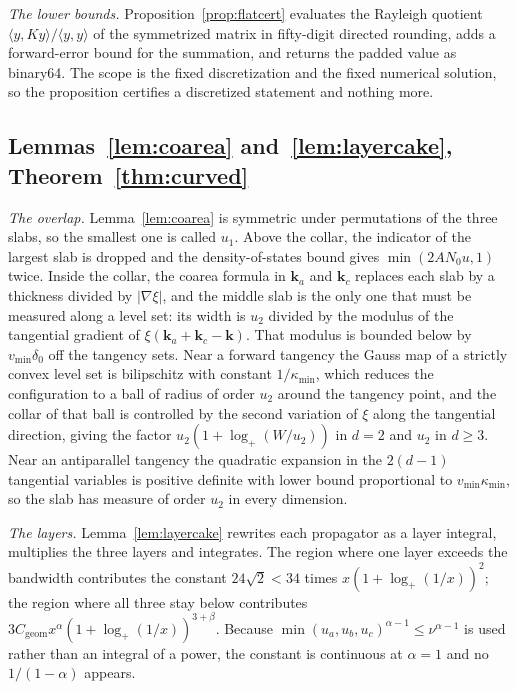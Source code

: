 \documentclass[11pt]{article}
\newcommand{\Cgeom}{C_{\mathrm{geom}}}
\theoremstyle{definition}
\theoremstyle{remark}
\begin{document}
\emph{The lower bounds.} Proposition~\ref{prop:flatcert} evaluates the Rayleigh quotient $\langle y,Ky\rangle/\langle y,y\rangle$ of the symmetrized matrix in fifty-digit directed rounding, adds a forward-error bound for the summation, and returns the padded value as binary64. The scope is the fixed discretization and the fixed numerical solution, so the proposition certifies a discretized statement and nothing more.

\subsection{Lemmas~\ref{lem:coarea} and~\ref{lem:layercake}, Theorem~\ref{thm:curved}}

\emph{The overlap.} Lemma~\ref{lem:coarea} is symmetric under permutations of the three slabs, so the smallest one is called $u_1$. Above the collar, the indicator of the largest slab is dropped and the density-of-states bound gives $\min(2AN_0u,1)$ twice. Inside the collar, the coarea formula in $\mathbf k_a$ and $\mathbf k_c$ replaces each slab by a thickness divided by $|\nabla\xi|$, and the middle slab is the only one that must be measured along a level set: its width is $u_2$ divided by the modulus of the tangential gradient of $\xi(\mathbf k_a+\mathbf k_c-\mathbf k)$. That modulus is bounded below by $v_{\min}\delta_0$ off the tangency sets. Near a forward tangency the Gauss map of a strictly convex level set is bilipschitz with constant $1/\kappa_{\min}$, which reduces the configuration to a ball of radius of order $u_2$ around the tangency point, and the collar of that ball is controlled by the second variation of $\xi$ along the tangential direction, giving the factor $u_2(1+\log_+(W/u_2))$ in $d=2$ and $u_2$ in $d\ge3$. Near an antiparallel tangency the quadratic expansion in the $2(d-1)$ tangential variables is positive definite with lower bound proportional to $v_{\min}\kappa_{\min}$, so the slab has measure of order $u_2$ in every dimension.

\emph{The layers.} Lemma~\ref{lem:layercake} rewrites each propagator as a layer integral, multiplies the three layers and integrates. The region where one layer exceeds the bandwidth contributes the constant $24\sqrt2<34$ times $x(1+\log_+(1/x))^2$; the region where all three stay below contributes $3\Cgeom x^{\alpha}(1+\log_+(1/x))^{3+\beta}$. Because $\min(u_a,u_b,u_c)^{\alpha-1}\le\nu^{\alpha-1}$ is used rather than an integral of a power, the constant is continuous at $\alpha=1$ and no $1/(1-\alpha)$ appears.
\end{document}
